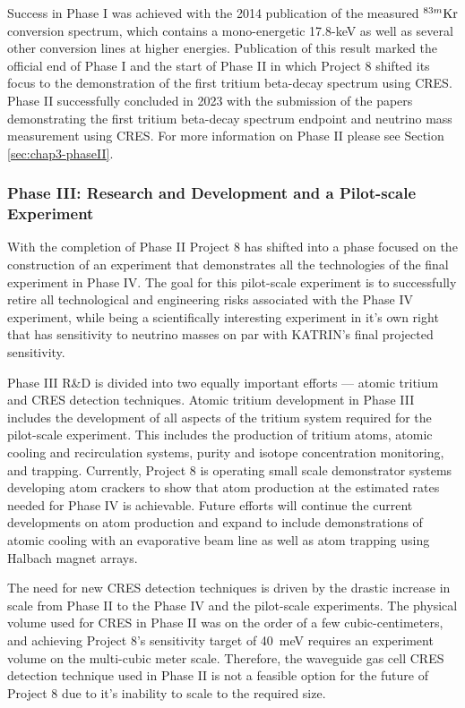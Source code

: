 Success in Phase I was achieved with the 2014 publication of the measured $^{83m}\rm{Kr}$ conversion spectrum, which contains a mono-energetic 17.8-keV as well as several other conversion lines at higher energies. Publication of this result marked the official end of Phase I and the start of Phase II in which Project 8 shifted its focus to the demonstration of the first tritium beta-decay spectrum using CRES. Phase II successfully concluded in 2023 with the submission of the papers demonstrating the first tritium beta-decay spectrum endpoint and neutrino mass measurement using CRES. For more information on Phase II please see Section \ref{sec:chap3-phaseII}.

\subsubsection*{Phase III: Research and Development and a Pilot-scale Experiment}

With the completion of Phase II Project 8 has shifted into a phase focused on the construction of an experiment that demonstrates all the technologies of the final experiment in Phase IV. The goal for this pilot-scale experiment is to successfully retire all technological and engineering risks associated with the Phase IV experiment, while being a scientifically interesting experiment in it's own right that has sensitivity to neutrino masses on par with KATRIN's final projected sensitivity. 

Phase III R\&D is divided into two equally important efforts --- atomic tritium and CRES detection techniques. Atomic tritium development in Phase III includes the development of all aspects of the tritium system required for the pilot-scale experiment. This includes the production of tritium atoms, atomic cooling and recirculation systems, purity and isotope concentration monitoring, and trapping. Currently, Project 8 is operating small scale demonstrator systems developing atom crackers to show that atom production at the estimated rates needed for Phase IV is achievable. Future efforts will continue the current developments on atom production and expand to include demonstrations of atomic cooling with an evaporative beam line as well as atom trapping using Halbach magnet arrays.

The need for new CRES detection techniques is driven by the drastic increase in scale from Phase II to the Phase IV and the pilot-scale experiments. The physical volume used for CRES in Phase II was on the order of a few cubic-centimeters, and achieving Project 8's sensitivity target of 40~meV requires an experiment volume on the multi-cubic meter scale. Therefore, the waveguide gas cell CRES detection technique used in Phase II is not a feasible option for the future of Project 8 due to it's inability to scale to the required size.

